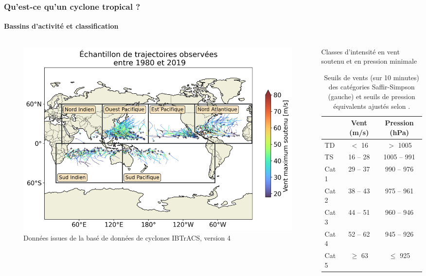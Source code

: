 \documentclass[aspectratio=169, usepdftitle=false, xcolor={dvipsnames}, 9pt,table]{beamer}
\begin{document}
\begin{frame}[c]
    \frametitle{Qu'est-ce qu'un cyclone tropical ?}
    \framesubtitle{Bassins d'activité et classification}
    \begin{columns}
        \begin{column}{0.65\textwidth}
            \begin{figure}[h]
                \centering
                \includegraphics[width=\textwidth]{Figures/Bassins_et_trajectoires_soutenance.png}
                \caption{Données issues de la basé de données de cyclones IBTrACS, version 4}
            \end{figure}
        \end{column}
        \begin{column}{0.35\textwidth}
            \begin{table}[h]
                \centering
                \footnotesize
                \caption{\centering \small Classes d'intensité en vent soutenu et en pression minimale}
                \begin{tabular}{l|c|c}
                     & Vent (m/s) & Pression (hPa) \\
                    \hline
                    TD & $<$ 16 & $>$ 1005 \\
                    TS & 16 -- 28 & 1005 -- 991 \\
                    Cat 1 & 29 -- 37 & 990 -- 976 \\
                    Cat 2 & 38 -- 43 & 975 -- 961 \\
                    Cat 3 & 44 -- 51 & 960 -- 946 \\
                    Cat 4 & 52 --  62 & 945 -- 926\\
                    Cat 5 & $\geq$ 63 & $\leq$ 925
                \end{tabular}
                \caption{Seuils de vents (sur 10 minutes) des catégories Saffir-Simpson (gauche) et seuils de pression équivalents ajustés
                selon \mbox{\cite{klotzbach_surface_2020}}.}
            \end{table}
        \end{column}
    \end{columns}
\end{frame}
\end{document}
